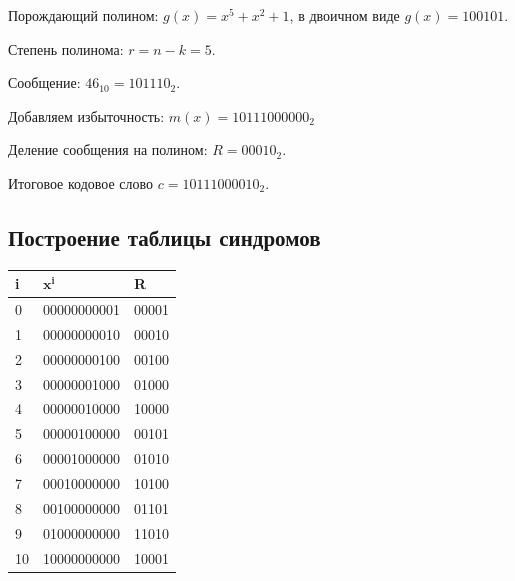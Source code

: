 \documentclass[a4paper, 14pt]{article}
\begin{document}
Порождающий полином: $g(x) = x^5 + x^2 +1$, в двоичном виде $g(x) = 100101$.

Степень полинома: $r = n - k = 5$.

Сообщение: $46                                                               _{10} = 101110_2$.

Добавляем избыточность: $m(x) = 10111000000_2 $

Деление сообщения на полином: $R = 00010_2$.

Итоговое кодовое слово $c = 10111000010_2$.

\subsection{Построение таблицы синдромов}
\begin{center}
  \begin{table}[H]
    \begin{tabular}{|l|l|l|}
      \hline
      \textbf{i} & $\mathbf{x^i}$ & \textbf{R} \\ \hline
      0 &                              00000000001 &           00001 \\ \hline
      1 &                              00000000010 &           00010 \\ \hline
      2 &                              00000000100 &           00100 \\ \hline
      3 &                              00000001000 &           01000 \\ \hline
      4 &                              00000010000 &           10000 \\ \hline
      5 &                              00000100000 &           00101 \\ \hline
      6 &                              00001000000 &           01010 \\ \hline
      7 &                              00010000000 &           10100 \\ \hline
      8 &                              00100000000 &           01101 \\ \hline
      9 &                              01000000000 &           11010 \\ \hline
      10 &                             10000000000 &           10001 \\ \hline

    \end{tabular}
  \end{table}

\end{center}
\end{document}
